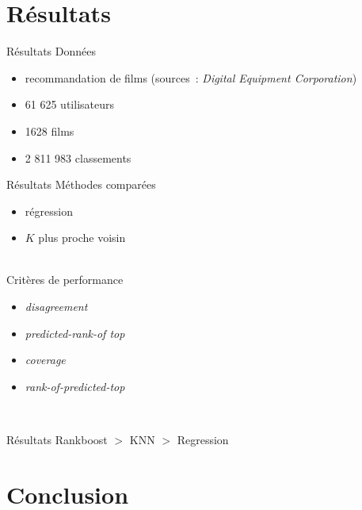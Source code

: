 \documentclass{beamer}
\begin{document}

\section{Résultats}

\begin{frame}{Résultats}
    Données
    \begin{itemize}
        \item recommandation de films (sources~:
              \emph{Digital Equipment Corporation})
        \item 61 625 utilisateurs
        \item 1628 films
        \item 2 811 983 classements
    \end{itemize}
\end{frame}

\begin{frame}{Résultats}
    Méthodes comparées
    \begin{itemize}
        \item régression
        \item $K$ plus proche voisin
    \end{itemize}
    ~\\
    Critères de performance
    \begin{itemize}
        \item \emph{disagreement}
        \item \emph{predicted-rank-of top}
        \item \emph{coverage}
        \item \emph{rank-of-predicted-top}
    \end{itemize}
    ~\\
    \begin{block}{Résultats}
    Rankboost $>$ KNN $>$ Regression
    \end{block}
\end{frame}


\section*{Conclusion}
\end{document}
